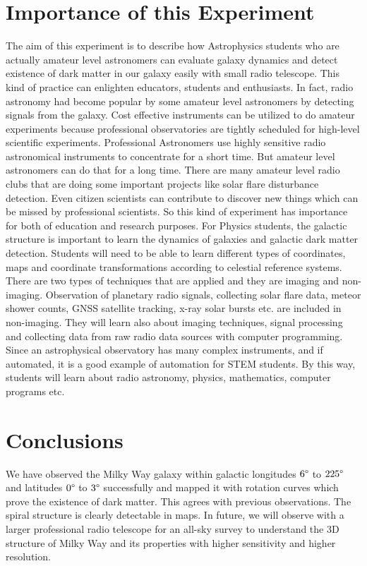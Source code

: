 \documentclass[10pt,conference]{IEEEtran}
\begin{document}
\section{Importance of this Experiment}
The aim of this experiment is to describe how Astrophysics students who are actually amateur level astronomers can evaluate galaxy dynamics and detect existence of dark matter in our galaxy easily with small radio telescope. This kind of practice can enlighten educators, students and enthusiasts. In fact, radio astronomy had become popular by some amateur level astronomers by detecting signals from the galaxy. Cost effective instruments can be utilized to do amateur experiments because professional observatories are tightly scheduled for high-level scientific experiments. Professional Astronomers use highly sensitive radio astronomical instruments to concentrate for a short time. But amateur level astronomers can do that for a long time. There are many amateur level radio clubs that are doing some important projects like solar flare disturbance detection. Even citizen scientists can contribute to discover new things which can be missed by professional scientists. So this kind of experiment has importance for both of education and research purposes. For Physics students, the galactic structure is important to learn the dynamics of galaxies and galactic dark matter detection. Students will need to be able to learn different types of coordinates, maps and coordinate transformations according to celestial reference systems. There are two types of techniques that are applied and they are imaging and non-imaging. Observation of planetary radio signals, collecting solar flare data, meteor shower counts, GNSS satellite tracking, x-ray solar bursts etc. are included in non-imaging. They will learn also about imaging techniques, signal processing and collecting data from raw radio data sources with computer programming. Since an astrophysical observatory has many complex instruments, and if automated, it is a good example of automation for STEM students. By this way, students will learn about radio astronomy, physics, mathematics, computer programs etc.



\section{Conclusions}

We have observed the Milky Way galaxy within galactic longitudes $6\degree$ to $225\degree$ and latitudes $0\degree$ to $3\degree$ successfully and mapped it with rotation curves which prove the existence of dark matter. This agrees with previous observations. The spiral structure is clearly detectable in maps. In future, we will observe with a larger professional radio telescope for an all-sky survey to understand the 3D structure of Milky Way and its properties with higher sensitivity and higher resolution.
\end{document}
